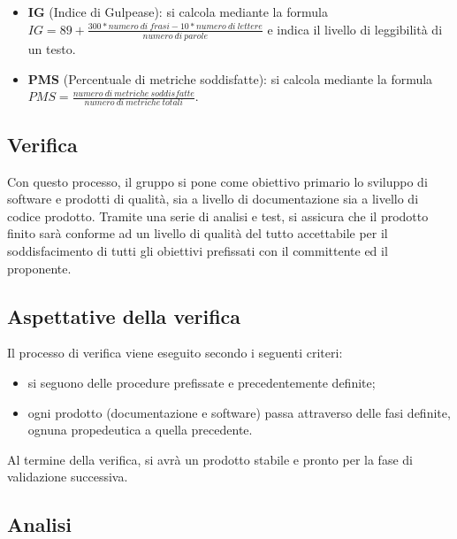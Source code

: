 \begin{itemize}
	\item \textbf{IG} (Indice di Gulpease): si calcola mediante la formula \newline $IG = 89+\frac{300*numero\ di\ frasi-10*numero\ di\ lettere}{numero\ di\ parole}$ e indica il livello di leggibilità di un testo.
\end{itemize}
\begin{itemize}
	\item \textbf{PMS} (Percentuale di metriche soddisfatte): si calcola mediante la formula \newline $PMS = \frac{numero\ di\ metriche\ soddisfatte}{numero\ di\ metriche\ totali}$.
\end{itemize}


\subsection{Verifica}
Con questo processo, il gruppo {\Gruppo} si pone come obiettivo primario lo sviluppo di software e prodotti di qualità, sia a livello di documentazione sia a livello di codice prodotto. Tramite una serie di analisi e test, si assicura che il prodotto finito sarà conforme ad un livello di qualità del tutto accettabile per il soddisfacimento di tutti gli obiettivi prefissati con il committente ed il proponente.
\subsection{Aspettative della verifica}
Il processo di verifica viene eseguito secondo i seguenti criteri:
\begin{itemize}
	\item si seguono delle procedure prefissate e precedentemente definite;
	\item ogni prodotto (documentazione e software) passa attraverso delle fasi definite, ognuna propedeutica a quella precedente.
	\end{itemize}
Al termine della verifica, si avrà un prodotto stabile e pronto per la fase di validazione successiva.

\subsection{Analisi}
